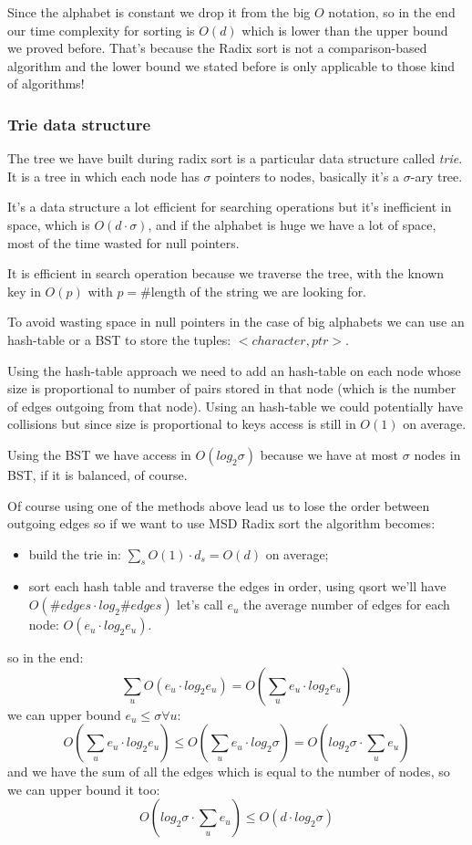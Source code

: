 Since the alphabet is constant we drop it from the big $O$ notation, so in the end our time complexity for sorting is $O(d)$ which is lower than the upper bound we proved before.
That's because the Radix sort is not a comparison-based algorithm and the lower bound we stated before is only applicable to those kind of algorithms!

\subsubsection{Trie data structure}
The tree we have built during radix sort is a particular data structure called \emph{trie}.
It is a tree in which each node has $\sigma$ pointers to nodes, basically it's a $\sigma$-ary tree.

It's a data structure a lot efficient for searching operations but it's inefficient in space, which is $O(d \cdot \sigma)$, and if the alphabet is huge we have a lot of space, most of the time wasted for null pointers.

It is efficient in search operation because we traverse the tree, with the known key in $O(p)$ with $p = \#$length of the string we are looking for.

To avoid wasting space in null pointers in the case of big alphabets we can use an hash-table or a BST to store the tuples: $<character, ptr>$.

Using the hash-table approach we need to add an hash-table on each node whose size is proportional to number of pairs stored in that node (which is the number of edges outgoing from that node).
Using an hash-table we could potentially have collisions but since size is proportional to keys access is still in $O(1)$ on average.

Using the BST we have access in $O(log_2 \sigma)$ because we have at most $\sigma$ nodes in BST, if it is balanced, of course.

Of course using one of the methods above lead us to lose the order between outgoing edges so if we want to use MSD Radix sort the algorithm becomes:
\begin{itemize}
    \item build the trie in: $\sum_s O(1) \cdot d_s = O(d)$ on average;
    \item sort each hash table and traverse the edges in order, using qsort we'll have $O(\#edges \cdot log_2 \#edges)$ let's call $e_u$ the average number of edges for each node: $O(e_u \cdot log_2 e_u)$.
\end{itemize}
so in the end:
$$
    \sum_u O(e_u \cdot log_2 e_u) = O\left(\sum_u e_u \cdot log_2 e_u\right)
$$
we can upper bound $e_u \leq \sigma \forall u$:
$$
    O\left(\sum_u e_u \cdot log_2 e_u\right) \leq O\left(\sum_u e_u \cdot log_2 \sigma\right) = O\left(log_2 \sigma \cdot \sum_u e_u\right) 
$$
and we have the sum of all the edges which is equal to the number of nodes, so we can upper bound it too:
$$
    O\left(log_2 \sigma \cdot \sum_u e_u\right) \leq O(d \cdot log_2 \sigma)
$$

